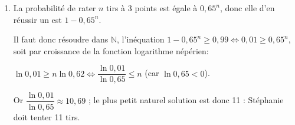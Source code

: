 \documentclass[10pt]{article}
\providecommand{\N}{\mathbb{N}}
\begin{document}
\begin{enumerate}
	\begin{enumerate}
		\item 
Les tirs sont indépendants et à chaque tir la probabilité de le réussir est égale à 0,35 : la variable aléatoire $X$ égale au nombre de réussites suit donc une loi binomiale de paramètres $n = 10$ et $p  = 0,35$.
		\item 
		On a $E = np = 10 \times 0,35 = 3,5$ : en moyenne sur $20$ tirs Stéphanie en réussira $7$.
		\item 
		La calculatrice donne $p(X \leqslant 6) \approx 0,97$.
		\item 
		On a de même $p(X \geqslant 6) \approx 0,095$.
	\end{enumerate}
\item 






La probabilité de rater $n$ tirs à 3 points est égale à $0,65^n$, donc elle d'en réussir un est $1 - 0,65^n$.

Il faut donc résoudre dans $\N$, l'inéquation $1 - 0,65^n \geqslant 0,99 \iff 0,01 \geqslant 0,65^n$, soit par croissance de la fonction logarithme népérien:

$\ln 0,01 \geqslant n\ln 0,62 \iff \dfrac{\ln 0,01}{\ln 0,65} \leqslant n$ (car $\ln 0,65 < 0$).

Or $\dfrac{\ln 0,01}{\ln 0,65} \approx 10,69$ ; le plus petit naturel solution est donc 11 : Stéphanie doit tenter 11 tirs.
\end{enumerate}

\bigskip
\end{document}
